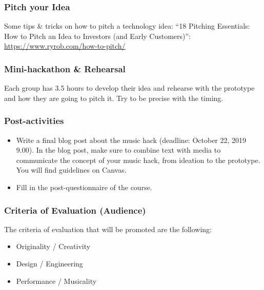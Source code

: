 \documentclass[screen, aspectratio=169]{beamer}
\begin{document}
%
\begin{frame}
\frametitle{Pitch your Idea}
Some tips \& tricks on how to pitch a technology idea: ``18 Pitching Essentials: How to Pitch an Idea to Investors (and Early Customers)'': \url{https://www.ryrob.com/how-to-pitch/}
\end{frame}%
%
\begin{frame}
  \frametitle{Mini-hackathon \& Rehearsal}
  Each group has 3.5 hours to develop their idea and rehearse with the prototype and how they are going to pitch it. Try to be precise with the timing.
\end{frame}
%
\begin{frame}
  \frametitle{Post-activities}
    \begin{itemize}
    	\item Write a final blog post about the music hack (deadline: October 22, 2019 9.00). In the blog post, make sure to combine text with media to communicate the concept of your music hack, from ideation to the prototype. You will find guidelines on Canvas.
         \item Fill in the post-questionnaire of the course.
    \end{itemize}
\end{frame}
%
\begin{frame}
  \frametitle{Criteria of Evaluation (Audience)}
  The criteria of evaluation that will be promoted are the following:
    \begin{itemize}
    	\item Originality / Creativity
	\item Design / Engineering
	\item Performance / Musicality
    \end{itemize}
\end{frame}
%
\end{document}
